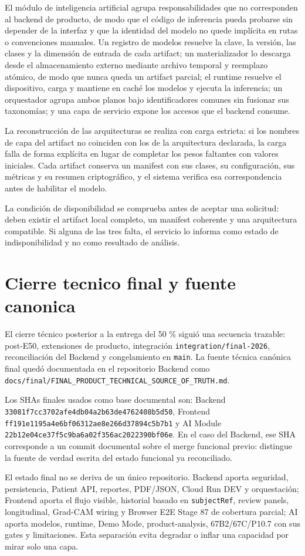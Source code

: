 El módulo de inteligencia artificial agrupa responsabilidades que no corresponden al backend de producto, de modo que el código de inferencia pueda probarse sin depender de la interfaz y que la identidad del modelo no quede implícita en rutas o convenciones manuales. Un registro de modelos resuelve la clave, la versión, las clases y la dimensión de entrada de cada artifact; un materializador lo descarga desde el almacenamiento externo mediante archivo temporal y reemplazo atómico, de modo que nunca queda un artifact parcial; el runtime resuelve el dispositivo, carga y mantiene en caché los modelos y ejecuta la inferencia; un orquestador agrupa ambos planos bajo identificadores comunes sin fusionar sus taxonomías; y una capa de servicio expone los accesos que el backend consume.

La reconstrucción de las arquitecturas se realiza con carga estricta: si los nombres de capa del artifact no coinciden con los de la arquitectura declarada, la carga falla de forma explícita en lugar de completar los pesos faltantes con valores iniciales. Cada artifact conserva un manifest con sus clases, su configuración, sus métricas y su resumen criptográfico, y el sistema verifica esa correspondencia antes de habilitar el modelo.

La condición de disponibilidad se comprueba antes de aceptar una solicitud: deben existir el artifact local completo, un manifest coherente y una arquitectura compatible. Si alguna de las tres falta, el servicio lo informa como estado de indisponibilidad y no como resultado de análisis.

\section{Cierre tecnico final y fuente canonica}
\label{anexo:f-cierre-tecnico-final}

El cierre técnico posterior a la entrega del 50 \% siguió una secuencia trazable: post-E50, extensiones de producto, integración \texttt{integration/final-2026}, reconciliación del Backend y congelamiento en \texttt{main}. La fuente técnica canónica final quedó documentada en el repositorio Backend como \texttt{docs/final/FINAL\_PRODUCT\_TECHNICAL\_SOURCE\_OF\_TRUTH.md}.

Los SHAs finales usados como base documental son: Backend \texttt{33081f7cc3702afe4db04a2b63de4762408b5d50}, Frontend \texttt{ff191e1195a4e6bf06312ae8e266d37894c5b7b1} y AI Module \texttt{22b12e04ce37f5c9ba6a02f356ac2022390bf06e}. En el caso del Backend, ese SHA corresponde a un commit documental sobre el merge funcional previo: distingue la fuente de verdad escrita del estado funcional ya reconciliado.

El estado final no se deriva de un único repositorio. Backend aporta seguridad, persistencia, Patient API, reportes, PDF/JSON, Cloud Run DEV y orquestación; Frontend aporta el flujo visible, historial basado en \texttt{subjectRef}, review panels, longitudinal, Grad-CAM wiring y Browser E2E Stage 87 de cobertura parcial; AI aporta modelos, runtime, Demo Mode, product-analysis, 67B2/67C/P10.7 con sus gates y limitaciones. Esta separación evita degradar o inflar una capacidad por mirar solo una capa.

